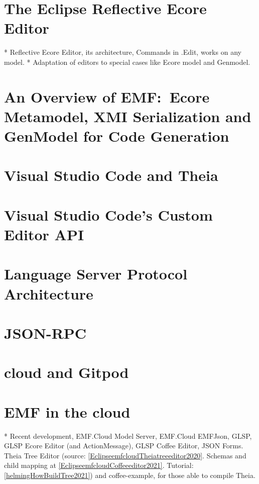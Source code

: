 \section{The Eclipse Reflective Ecore Editor}

* Reflective Ecore Editor, its architecture, Commands in .Edit, works on any model.
* Adaptation of editors to special cases like Ecore model and Genmodel.

\section{An Overview of EMF:\ Ecore Metamodel, XMI Serialization and GenModel for Code Generation}\label{sec:emf-metamodel}



\section{Visual Studio Code and Theia}




\section{Visual Studio Code's Custom Editor API}\label{sec:vscode-custom-editor}




\section{Language Server Protocol Architecture}\label{sec:lsp}




\section{JSON-RPC}\label{sec:json-rpc}

\section{\Gls{cloud} and \gls{Gitpod}}




\section{\acrlong{EMF} in the \Gls{cloud}}\label{sec:emf-in-cloud}
* Recent development, EMF.Cloud Model Server, EMF.Cloud EMFJson, GLSP, GLSP Ecore Editor (and ActionMessage\label{par:glsp-actionmessage}), GLSP Coffee Editor, JSON Forms.
Theia Tree Editor\label{par:theia-tree-editor} (source: \cref{EclipseemfcloudTheiatreeeditor2020}. Schemas and child mapping at \cref{EclipseemfcloudCoffeeeditor2021}. Tutorial: \cref{helmingHowBuildTree2021}) and coffee-example, for those able to compile Theia.

